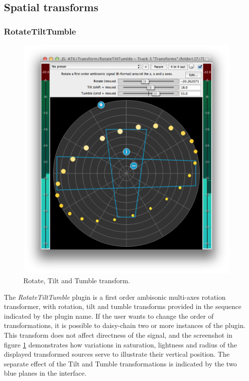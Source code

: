 \documentclass{article}
\begin{document}


\subsection{Spatial transforms}\label{sec:transforms}

\subsubsection{RotateTiltTumble}\label{sec:rotate}

\begin{figure}[h]
\captionsetup{aboveskip=-6pt}
\centering
\includegraphics[width=0.9\columnwidth]{figures/rotateTiltTumble.png}
\setlength{\abovecaptionskip}{0pt plus 3pt minus 2pt} %
\caption{Rotate, Tilt and Tumble transform.\label{fig:rotateTransform}}
\end{figure}

The \emph{RotateTiltTumble} plugin is a first order ambisonic multi-axes rotation transformer, with rotation, tilt and tumble transforms provided in the sequence indicated by the plugin name.
If the user wants to change the order of transformations, it is possible to daisy-chain two or more instances of the plugin.
This transform does not affect directness of the signal, and the screenshot in figure \ref{fig:rotateTransform} demonstrates how variations in saturation, lightness and radius of the displayed transformed sources serve to illustrate their vertical position. The separate effect of the Tilt and Tumble transformations is indicated by the two blue planes in the interface.
\end{document}

